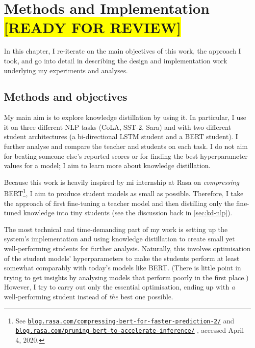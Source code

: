 \documentclass[bsc,frontabs,twoside,singlespacing,parskip,deptreport]{infthesis}
\def\reviewready{\colorbox{yellow}{[READY FOR REVIEW]}}
\newcommand\rurl[1]{%
  \href{https://#1}{\nolinkurl{#1}}%
}
\begin{document}
\chapter{Methods and Implementation \reviewready}{
  \label{chap:methods-implementation}

  In this chapter, I re-iterate on the main objectives of this work, the approach I took, and go into detail in describing the design and implementation work underlying my experiments and analyses.

  \section{Methods and objectives}{
    \label{sec:methods}
    My main aim is to explore knowledge distillation by using it. In particular, I use it on three different NLP tasks (CoLA, SST-2, Sara) and with two different student architectures (a bi-directional LSTM student and a BERT student). I further analyse and compare the teacher and students on each task. I do not aim for beating someone else's reported scores or for finding the best hyperparameter values for a model; I aim to learn more about knowledge distillation.

    Because this work is heavily inspired by mi internship at Rasa on \textit{compressing} BERT\footnote{See \rurl{blog.rasa.com/compressing-bert-for-faster-prediction-2/} and \rurl{blog.rasa.com/pruning-bert-to-accelerate-inference/}, accessed April 4, 2020.}, I aim to produce student models as small as possible. Therefore, I take the approach of first fine-tuning a teacher model and then distilling only the fine-tuned knowledge into tiny students (see the discussion back in \autoref{sec:kd-nlp}).

    The most technical and time-demanding part of my work is setting up the system's implementation and using knowledge distillation to create small yet well-performing students for further analysis. Naturally, this involves optimisation of the student models' hyperparameters to make the students perform at least somewhat comparably with today's models like BERT. (There is little point in trying to get insights by analysing models that perform poorly in the first place.) However, I try to carry out only the essential optimisation, ending up with \textit{a} well-performing student instead of \textit{the} best one possible.

}}
\end{document}
